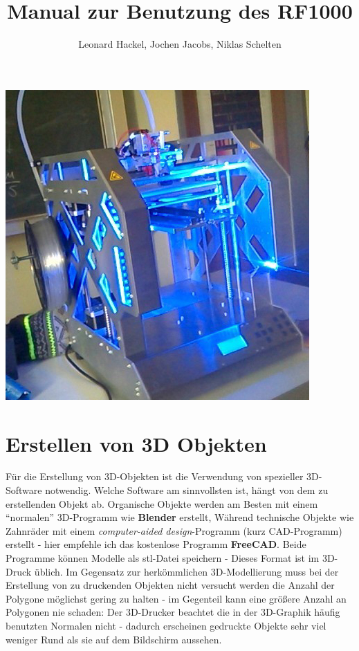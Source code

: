 \documentclass[11pt,a4paper]{scrartcl}
\author{Leonard Hackel, Jochen Jacobs, Niklas Schelten}
\affil{Herder-Gymnasium}
\title{Manual zur Benutzung des RF1000}
\begin{document}
\maketitle
\begin{center}
\includegraphics[scale=0.75]{res/31_1.jpg}
\end{center}
\pagebreak
\tableofcontents
\vspace{11pt}
\section{Erstellen von 3D Objekten}
Für die Erstellung von 3D-Objekten ist die Verwendung von spezieller 3D-Software notwendig. Welche Software am sinnvollsten ist, hängt von dem zu erstellenden Objekt ab. Organische Objekte werden am Besten mit einem \enquote{normalen} 3D-Programm wie \textbf{Blender} erstellt, Während technische Objekte wie Zahnräder mit einem \textit{computer-aided design}-Programm (kurz CAD-Programm) erstellt - hier empfehle ich das kostenlose Programm \textbf{FreeCAD}. Beide Programme können Modelle als stl-Datei speichern - Dieses Format ist im 3D-Druck üblich. Im Gegensatz zur herkömmlichen 3D-Modellierung muss bei der Erstellung von zu druckenden Objekten nicht versucht werden die Anzahl der Polygone möglichst gering zu halten - im Gegenteil kann eine größere Anzahl an Polygonen nie schaden: Der 3D-Drucker beachtet die in der 3D-Graphik häufig benutzten Normalen nicht - dadurch erscheinen gedruckte Objekte sehr viel weniger Rund als sie auf dem Bildschirm aussehen.
\end{document}

